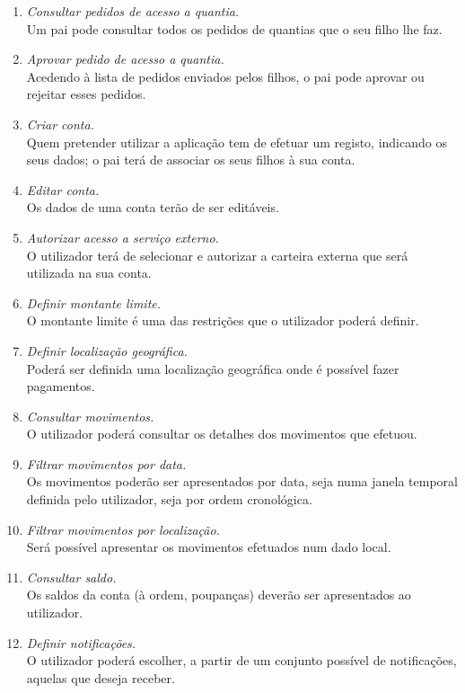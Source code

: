 \documentclass{article}
\begin{document}
    \begin{enumerate}
      \item \emph{Consultar pedidos de acesso a quantia.}\\
Um pai pode consultar todos os pedidos de quantias que o seu filho lhe faz.
      \item \emph{Aprovar pedido de acesso a quantia.}\\
Acedendo à lista de pedidos enviados pelos filhos, o pai pode aprovar ou rejeitar esses pedidos.
      \item \emph{Criar conta.}\\
Quem pretender utilizar a aplicação tem de efetuar um registo, indicando os seus dados; o pai terá de associar os seus filhos à sua conta.
      \item \emph{Editar conta.} \\
Os dados de uma conta terão de ser editáveis.
      \item \emph{Autorizar acesso a serviço externo.}\\
O utilizador terá de selecionar e autorizar a carteira externa que será utilizada na sua conta.
      \item \emph{Definir montante limite.}\\
O montante limite é uma das restrições que o utilizador poderá definir.
      \item \emph{Definir localização geográfica.}\\
Poderá ser definida uma localização geográfica onde é possível fazer pagamentos.
      \item \emph{Consultar movimentos.}\\
O utilizador poderá consultar os detalhes dos movimentos que efetuou.
      \item \emph{Filtrar movimentos por data.}\\
Os movimentos poderão ser apresentados por data, seja numa janela temporal definida pelo utilizador, seja por ordem cronológica.
      \item \emph{Filtrar movimentos por localização.}\\
Será possível apresentar os movimentos efetuados num dado local.
      \item \emph{Consultar saldo.}\\
Os saldos da conta (à ordem, poupanças) deverão ser apresentados ao utilizador.
      \item \emph{Definir notificações.}\\
O utilizador poderá escolher, a partir de um conjunto possível de notificações, aquelas que deseja receber.

\end{enumerate}
\end{document}
